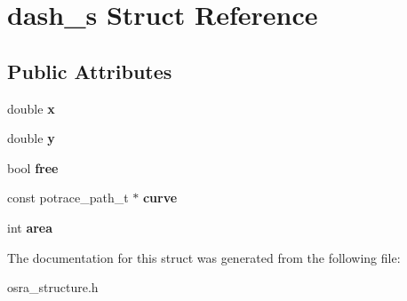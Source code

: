 \hypertarget{structdash__s}{\section{dash\-\_\-s Struct Reference}
\label{structdash__s}
}
\subsection*{Public Attributes}
\begin{DoxyCompactItemize}
\item 
\hypertarget{structdash__s_a7a77c31bde82ce2249d78b612436f009}{double {\bfseries x}}\label{structdash__s_a7a77c31bde82ce2249d78b612436f009}

\item 
\hypertarget{structdash__s_a788a0c824933224ada40b907f53880a8}{double {\bfseries y}}\label{structdash__s_a788a0c824933224ada40b907f53880a8}

\item 
\hypertarget{structdash__s_afe4ca2519e68786f7d21fc7632d19780}{bool {\bfseries free}}\label{structdash__s_afe4ca2519e68786f7d21fc7632d19780}

\item 
\hypertarget{structdash__s_a4bd56774af600868d5bcd54ee22d2fa9}{const potrace\-\_\-path\-\_\-t $\ast$ {\bfseries curve}}\label{structdash__s_a4bd56774af600868d5bcd54ee22d2fa9}

\item 
\hypertarget{structdash__s_aee07e43ca4676ad119ad5039cc86499d}{int {\bfseries area}}\label{structdash__s_aee07e43ca4676ad119ad5039cc86499d}

\end{DoxyCompactItemize}


The documentation for this struct was generated from the following file\-:\begin{DoxyCompactItemize}
\item 
osra\-\_\-structure.\-h\end{DoxyCompactItemize}
